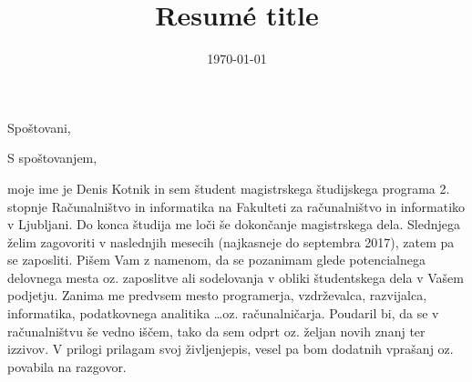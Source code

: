 \documentclass[11pt,a4paper,sans]{moderncv}        %
\title{Resumé title}                               %
\begin{document}
\date{\today}
\opening{Spoštovani,}
\closing{S spoštovanjem,}
\makelettertitle

moje ime je Denis Kotnik in sem študent magistrskega študijskega programa 2. stopnje Računalništvo in informatika na Fakulteti za računalništvo in informatiko v Ljubljani.
\newline
Do konca študija me loči še dokončanje magistrskega dela. Slednjega želim zagovoriti v naslednjih mesecih (najkasneje do septembra 2017), zatem pa se zaposliti.
\newline
\newline
Pišem Vam z namenom, da se pozanimam glede potencialnega delovnega mesta oz. zaposlitve ali sodelovanja v obliki študentskega dela v Vašem podjetju.
\newline
Zanima me predvsem mesto programerja, vzdrževalca, razvijalca, informatika, podatkovnega analitika \dots oz. računalničarja. Poudaril bi, da se v računalništvu še vedno iščem, tako da sem odprt oz. željan novih znanj ter izzivov.
\newline
\newline
V prilogi prilagam svoj življenjepis, vesel pa bom dodatnih vprašanj oz. povabila na razgovor.
\newline
\newline

\makeletterclosing
\end{document}
